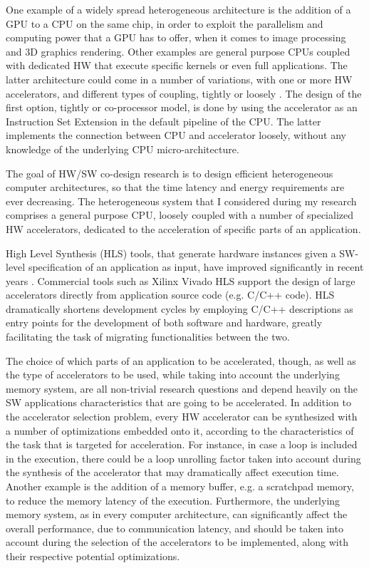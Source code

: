 \documentclass[]{usiinfthesis}
\begin{document}
One example of a widely spread heterogeneous architecture is the addition of a GPU to a CPU on the 
same chip, in order to exploit the parallelism and computing power that a GPU has to offer, when 
it comes to image processing and 3D graphics rendering. Other examples are general purpose CPUs 
coupled with dedicated HW that execute specific kernels or even full applications. The latter 
architecture could come in a number of variations, with one or more HW accelerators, and different 
types of coupling, tightly or loosely \cite{CotaJun15}. The design of the first option, tightly or 
co-processor model, is done by using the accelerator as an Instruction Set Extension in the default 
pipeline of the CPU. The latter implements the connection between CPU and accelerator loosely, without 
any knowledge of the underlying CPU micro-architecture.\par
%
%
The goal of HW/SW co-design research is to design efficient heterogeneous computer architectures, so that the
time latency and energy requirements are ever decreasing. The heterogeneous system
that I considered during my research comprises a general purpose CPU, loosely coupled with a number of 
specialized HW accelerators, dedicated to the acceleration of specific parts of an application.\par

%
%
High Level Synthesis (HLS) tools, that generate hardware instances given a SW-level specification of an
application as input,
have improved significantly in recent years
 \cite{MeeusSep12}. Commercial tools such as Xilinx Vivado HLS \cite{VivadoHLSMar17} 
support the design of large accelerators 
directly from application source code (e.g. C/C++ code). HLS dramatically shortens development cycles by employing C/C++ descriptions as entry points for the development of both software and hardware, greatly facilitating the task of migrating functionalities between the two.
\par


The choice of which parts of an application to be accelerated, though, as well as the type 
of accelerators to be used, while taking into account the underlying memory system, are all
non-trivial research questions and depend heavily on the SW applications characteristics that
are going to be accelerated. In addition to the accelerator selection problem, 
every HW accelerator can be synthesized with a number of optimizations embedded onto it, according to 
the characteristics of the task that is targeted for acceleration. For instance, in case 
a loop is included in the execution, there could be a loop unrolling factor taken into account during 
the synthesis of the accelerator that may dramatically affect execution time. Another example 
is the addition of a memory buffer, e.g. a scratchpad memory, to reduce the memory latency
of the execution. Furthermore, the underlying memory system, as in every computer architecture, can
significantly affect the overall performance, due to communication latency, and should be taken into 
account during the selection of the accelerators to be implemented, along with their respective 
potential optimizations.\par
\end{document}
